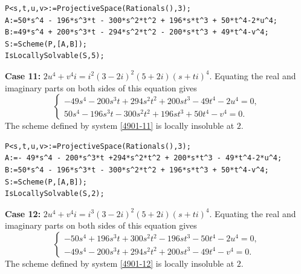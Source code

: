 \documentclass[a4paper,12pt,english,reqno]{amsart}
\begin{document}
\begin{lstlisting}
P<s,t,u,v>:=ProjectiveSpace(Rationals(),3);
A:=50*s^4 - 196*s^3*t - 300*s^2*t^2 + 196*s*t^3 + 50*t^4-2*u^4;
B:=49*s^4 + 200*s^3*t - 294*s^2*t^2 - 200*s*t^3 + 49*t^4-v^4;
S:=Scheme(P,[A,B]);
IsLocallySolvable(S,5);
\end{lstlisting}

{\bf Case 11:} $2u^4+v^4i=i^2(3- 2i)^2(5+2i)(s+ti)^4$.  Equating the real and imaginary parts on both sides of this equation gives
\begin{equation}\label{4901-11}
\begin{cases}
-49s^4 - 200s^3t + 294s^2t^2 + 200st^3 - 49t^4 - 2u^4=0,\\
50s^4 - 196s^3t - 300s^2t^2 + 196st^3 + 50t^4 - v^4=0.
\end{cases}
\end{equation}
The scheme defined by system \eqref{4901-11} is locally insoluble at $2$.

\begin{lstlisting}
P<s,t,u,v>:=ProjectiveSpace(Rationals(),3);
A:=- 49*s^4 - 200*s^3*t +294*s^2*t^2 + 200*s*t^3 - 49*t^4-2*u^4;
B:=50*s^4 - 196*s^3*t - 300*s^2*t^2 + 196*s*t^3 + 50*t^4-v^4;
S:=Scheme(P,[A,B]);
IsLocallySolvable(S,2);
\end{lstlisting}



{\bf Case 12:} $2u^4+v^4i=i^3(3- 2i)^2(5+2i)(s+ti)^4$.  Equating the real and imaginary parts on both sides of this equation gives
\begin{equation}\label{4901-12}
\begin{cases}
-50s^4 + 196s^3t + 300s^2t^2 - 196st^3 - 50t^4 - 2u^4=0,\\
-49s^4 - 200s^3t + 294s^2t^2 + 200st^3 - 49t^4 - v^4=0.
\end{cases}
\end{equation}
The scheme defined by system \eqref{4901-12} is locally insoluble at $2$.
\end{document}

